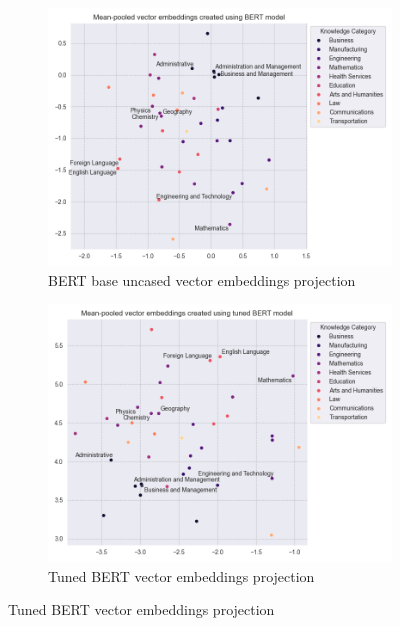 \documentclass[12pt]{article}
\begin{document}
\begin{figure}
    \centering
  
    \begin{subfigure}{0.45\textwidth}
      \centering
      \includegraphics[width=\linewidth]{../plots/base_bert.png}
      \caption{BERT base uncased vector embeddings projection}
      \label{fig:ksa_space_base_bert}
    \end{subfigure}
    \hfill
    \begin{subfigure}{0.45\textwidth}
      \centering
      \includegraphics[width=\linewidth]{../plots/tuned_bert.png}
      \caption{Tuned BERT vector embeddings projection}
      \label{fig:ksa_space_tuned_bert}
    \end{subfigure}
  

\end{figure}
\end{document}
